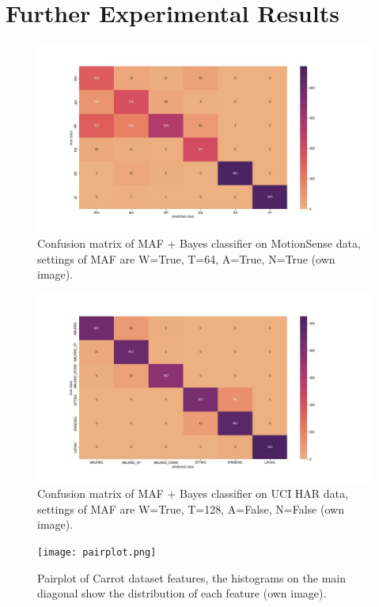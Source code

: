 \documentclass[11pt,titlepage,oneside,openany]{book}
\begin{document}
\chapter{Further Experimental Results}
\label{cha:appendix-b}
\begin{figure}
	\centering
	\includegraphics[width=\linewidth]{conf_mat_mos.jpg}
	\caption[Confusion matrix MotionSense]{Confusion matrix of MAF + Bayes classifier on MotionSense data, settings of MAF are W=True, T=64, A=True, N=True (own image).}
	\label{fig:confm}
\end{figure}

\begin{figure}
	\centering
	\includegraphics[width=\linewidth]{conf_mat_uci.jpg}
	\caption[Confusion matrix UCIHAR]{Confusion matrix of MAF + Bayes classifier on UCI HAR data, settings of MAF are W=True, T=128, A=False, N=False (own image).}
	\label{fig:confu}
\end{figure}

\begin{figure}
	\centering
	\texttt{[image: pairplot.png]}
	\caption[Pairplot Carrot]{Pairplot of Carrot dataset features, the histograms on the main diagonal show the distribution of each feature (own image).}
	\label{fig:pair}
\end{figure}
\end{document}
